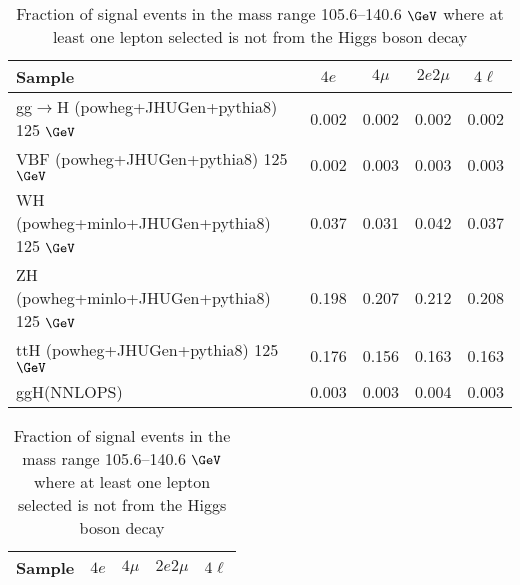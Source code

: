 \documentclass{article}
\begin{document}
 
 
\begin{table}[!h!tb]
\begin{center}
\small
\caption{
Fraction of signal events in the mass range 105.6--140.6 $\GeV$ where at least one lepton selected is not from the Higgs boson decay
\label{tab:wrongracSM}
}
\begin{tabular}{|l|c|c|c|c|} \hline 
Sample & $4e$ & $4\mu$ & $2e2\mu$ & $4\ell$ \\ \hline 
gg$\rightarrow$H ({\sc powheg+JHUGen+pythia8}) 125 $\GeV$ & 0.002 & 0.002 & 0.002 & 0.002 \\ 
VBF ({\sc powheg+JHUGen+pythia8}) 125 $\GeV$ & 0.002 & 0.003 & 0.003 & 0.003 \\ 
WH ({\sc powheg+minlo+JHUGen+pythia8}) 125 $\GeV$ & 0.037 & 0.031 & 0.042 & 0.037 \\ 
ZH ({\sc powheg+minlo+JHUGen+pythia8}) 125 $\GeV$ & 0.198 & 0.207 & 0.212 & 0.208 \\ 
ttH ({\sc powheg+JHUGen+pythia8}) 125 $\GeV$ & 0.176 & 0.156 & 0.163 & 0.163 \\ 
ggH(NNLOPS) & 0.003 & 0.003 & 0.004 & 0.003 \\ 

\hline
\end{tabular}
\normalsize
\end{center}
\end{table}
 
 
 
\begin{table}[!h!tb]
\begin{center}
\small
\caption{
Fraction of signal events in the mass range 105.6--140.6 $\GeV$ where at least one lepton selected is not from the Higgs boson decay
\label{tab:wrongfracExo}
}
\begin{tabular}{|l|c|c|c|c|} \hline 
Sample & $4e$ & $4\mu$ & $2e2\mu$ & $4\ell$ \\ \hline 

\hline
\end{tabular}
\normalsize
\end{center}
\end{table}
 
 
 
\end{document}
